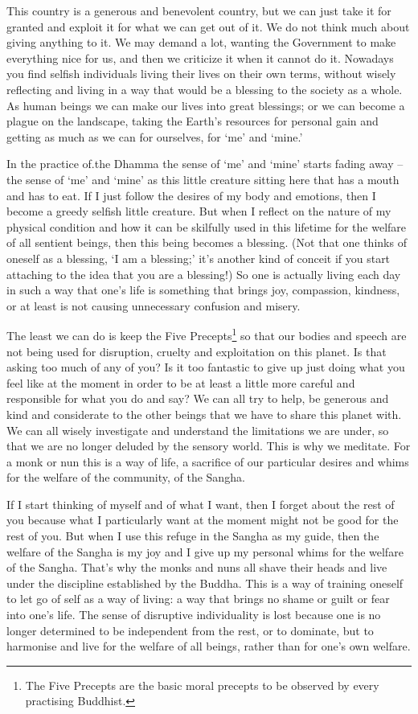 This country is a generous and benevolent country, but we can just take it for granted and exploit it for what we can get out of it. We do not think much about giving anything to it. We may demand a lot, wanting the Government to make everything nice for us, and then we criticize it when it cannot do it. Nowadays you find selfish individuals living their lives on their own terms, without wisely reflecting and living in a way that would be a blessing to the society as a whole. As human beings we can make our lives into great blessings; or we can become a plague on the landscape, taking the Earth's resources for personal gain and getting as much as we can for ourselves, for `me' and `mine.'

In the practice of.the Dhamma the sense of `me' and `mine' starts fading away -- the sense of `me' and `mine' as this little creature sitting here that has a mouth and has to eat. If I just follow the desires of my body and emotions, then I become a greedy selfish little creature. But when I reflect on the nature of my physical condition and how it can be skilfully used in this lifetime for the welfare of all sentient beings, then this being becomes a blessing. (Not that one thinks of oneself as a blessing, `I am a blessing;' it's another kind of conceit if you start attaching to the idea that you are a blessing!) So one is actually living each day in such a way that one's life is something that brings joy, compassion, kindness, or at least is not causing unnecessary confusion and misery.

The least we can do is keep the Five Precepts\footnote{The Five Precepts are the basic moral precepts to be observed by every practising Buddhist.} so that our bodies and speech are not being used for disruption, cruelty and exploitation on this planet. Is that asking too much of any of you? Is it too fantastic to give up just doing what you feel like at the moment in order to be at least a little more careful and responsible for what you do and say? We can all try to help, be generous and kind and considerate to the other beings that we have to share this planet with. We can all wisely investigate and understand the limitations we are under, so that we are no longer deluded by the sensory world. This is why we meditate. For a monk or nun this is a way of life, a sacrifice of our particular desires and whims for the welfare of the community, of the Sangha.

If I start thinking of myself and of what I want, then I forget about the rest of you because what I particularly want at the moment might not be good for the rest of you. But when I use this refuge in the Sangha as my guide, then the welfare of the Sangha is my joy and I give up my personal whims for the welfare of the Sangha. That's why the monks and nuns all shave their heads and live under the discipline established by the Buddha. This is a way of training oneself to let go of self as a way of living: a way that brings no shame or guilt or fear into one's life. The sense of disruptive individuality is lost because one is no longer determined to be independent from the rest, or to dominate, but to harmonise and live for the welfare of all beings, rather than for one's own welfare.

